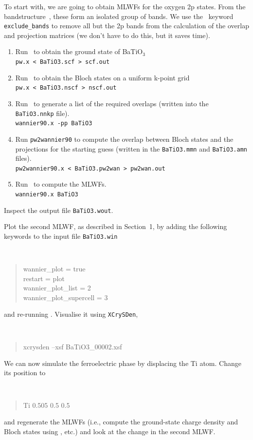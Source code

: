\documentclass[a4paper,11pt,twoside]{article}
\begin{document}
 To start with, we are going to obtain MLWFs for the oxygen 2p
  states. From the bandstructure~\cite{marzari-arxiv98}, these form an isolated
  group of bands. We use the \wannier\ keyword {\tt exclude\_bands} to
  remove all but the 2p bands from the calculation of the overlap
  and projection matrices (we don't have to do this, but it saves time).

\begin{enumerate}
\item Run \pwscf\ to obtain the ground state of BaTiO$_3$\\
{\tt pw.x < BaTiO3.scf > scf.out}

\item Run \pwscf\ to obtain the Bloch states on a uniform k-point grid\\
{\tt pw.x < BaTiO3.nscf > nscf.out}

\item Run \wannier\ to generate a list of the required overlaps (written
  into the {\tt BaTiO3.nnkp} file).\\ 
{\tt wannier90.x -pp BaTiO3}

\item Run {\tt pw2wannier90} to compute the overlap between Bloch
  states and the projections for the starting guess (written in the
  {\tt BaTiO3.mmn} and {\tt BaTiO3.amn} files).\\  
{\tt pw2wannier90.x < BaTiO3.pw2wan > pw2wan.out}

\item Run \wannier\ to compute the MLWFs.\\
{\tt wannier90.x BaTiO3}
\end{enumerate}

Inspect the output file {\tt BaTiO3.wout}. 

Plot the second MLWF, as described in Section~1, by adding the
following keywords to the input file {\tt BaTiO3.win}
{\tt
\begin{quote}
wannier\_plot = true\\
restart = plot\\
wannier\_plot\_list = 2\\
wannier\_plot\_supercell = 3
\end{quote} }
and re-running \wannier. Visualise it using {\tt XCrySDen},
{\tt
\begin{quote}
xcrysden --xsf BaTiO3\_00002.xsf
\end{quote} }

We can now simulate the ferroelectric phase by displacing the Ti
  atom. Change its position to 
{\tt
\begin{quote}
Ti 0.505 0.5 0.5
\end{quote}
}
and regenerate the MLWFs (i.e., compute the ground-state charge
density and Bloch states using \pwscf, etc.) and look at the change in
the second MLWF.
\end{document}
